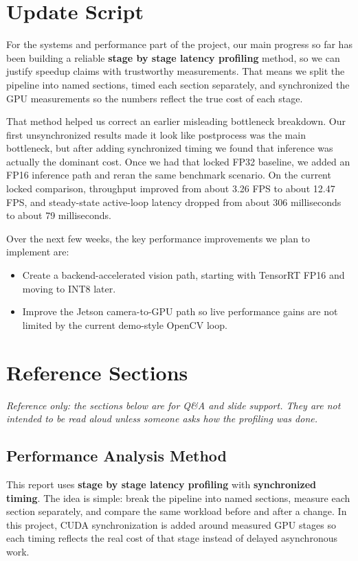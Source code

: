 \documentclass[11pt]{article}
\begin{document}
\clearpage

\section*{Update Script}

For the systems and performance part of the project, our main progress so far has been building a reliable \textbf{stage by stage latency profiling} method, so we can justify speedup claims with trustworthy measurements. That means we split the pipeline into named sections, timed each section separately, and synchronized the GPU measurements so the numbers reflect the true cost of each stage.

That method helped us correct an earlier misleading bottleneck breakdown. Our first unsynchronized results made it look like postprocess was the main bottleneck, but after adding synchronized timing we found that inference was actually the dominant cost. Once we had that locked FP32 baseline, we added an FP16 inference path and reran the same benchmark scenario. On the current locked comparison, throughput improved from about 3.26 FPS to about 12.47 FPS, and steady-state active-loop latency dropped from about 306 milliseconds to about 79 milliseconds.

Over the next few weeks, the key performance improvements we plan to implement are:
\begin{itemize}
\item Create a backend-accelerated vision path, starting with TensorRT FP16 and moving to INT8 later.
\item Improve the Jetson camera-to-GPU path so live performance gains are not limited by the current demo-style OpenCV loop.
\end{itemize}

\section*{Reference Sections}
{\small \textit{Reference only: the sections below are for Q\&A and slide support. They are not intended to be read aloud unless someone asks how the profiling was done.}}

\subsection*{Performance Analysis Method}
This report uses \textbf{stage by stage latency profiling} with \textbf{synchronized timing}. The idea is simple: break the pipeline into named sections, measure each section separately, and compare the same workload before and after a change. In this project, CUDA synchronization is added around measured GPU stages so each timing reflects the real cost of that stage instead of delayed asynchronous work.
\end{document}
